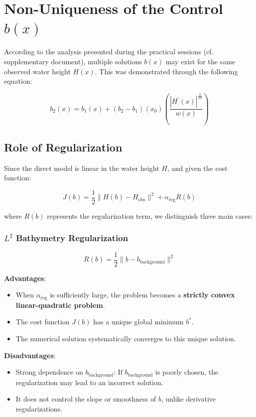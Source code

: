 \documentclass{article}
\begin{document}
\section{Non-Uniqueness of the Control \( b(x) \)}
\label{subsec:non_unicite}

According to the analysis presented during the practical sessions (cf. supplementary document), multiple solutions \( b(x) \) may exist for the same observed water height \( H(x) \). This was demonstrated through the following equation:

\[
b_2(x) = b_1(x) + (b_2 - b_1)(x_0) \left(\frac{|H^{\prime}(x)|^{\frac{3}{10}}}{w(x)}\right)
\label{eq:non_unicite}
\]

\subsection{Role of Regularization}
Since the direct model is linear in the water height \( H \), and given the cost function:

\[
J(b) = \frac{1}{2}\|H(b) - H_{\text{obs}}\|^2 + \alpha_{\text{reg}} R(b)
\label{eq:loss}
\]

where \( R(b) \) represents the regularization term, we distinguish three main cases:

\subsubsection{\( L^2 \) Bathymetry Regularization}
\[
R(b) = \frac{1}{2}\|b - b_{\text{background}}\|^2
\]

\textbf{Advantages}:
\begin{itemize}
\item When \( \alpha_{\text{reg}} \) is sufficiently large, the problem becomes a \textbf{strictly convex linear-quadratic problem}.
\item The cost function \( J(b) \) has a unique global minimum \( b^* \).
\item The numerical solution systematically converges to this unique solution.
\end{itemize}

\textbf{Disadvantages}:
\begin{itemize}
    \item Strong dependence on \( b_{\text{background}} \): If \( b_{\text{background}} \) is poorly chosen, the regularization may lead to an incorrect solution.
    \item It does not control the slope or smoothness of \( b \), unlike derivative regularizations.
\end{itemize}
\end{document}
